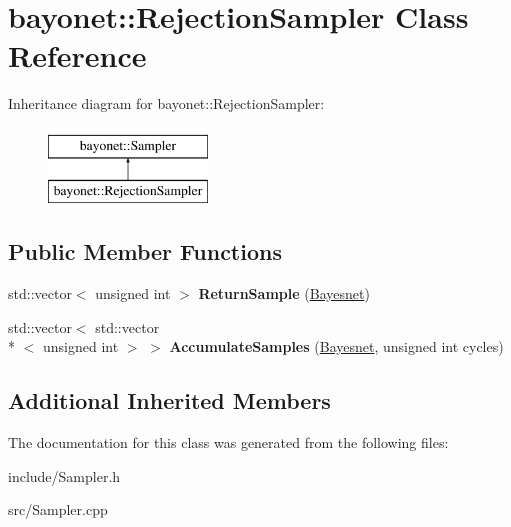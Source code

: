 \hypertarget{classbayonet_1_1_rejection_sampler}{\section{bayonet\-:\-:Rejection\-Sampler Class Reference}
\label{classbayonet_1_1_rejection_sampler}
}
Inheritance diagram for bayonet\-:\-:Rejection\-Sampler\-:\begin{figure}[H]
\begin{center}
\leavevmode
\includegraphics[height=2.000000cm]{classbayonet_1_1_rejection_sampler}
\end{center}
\end{figure}
\subsection*{Public Member Functions}
\begin{DoxyCompactItemize}
\item 
\hypertarget{classbayonet_1_1_rejection_sampler_afc42e3115c1bc96fa19ff1eb8a082180}{std\-::vector$<$ unsigned int $>$ {\bfseries Return\-Sample} (\hyperlink{classbayonet_1_1_bayesnet}{Bayesnet})}\label{classbayonet_1_1_rejection_sampler_afc42e3115c1bc96fa19ff1eb8a082180}

\item 
\hypertarget{classbayonet_1_1_rejection_sampler_a036f41259a143b1a101047fcdcf6a580}{std\-::vector$<$ std\-::vector\\*
$<$ unsigned int $>$ $>$ {\bfseries Accumulate\-Samples} (\hyperlink{classbayonet_1_1_bayesnet}{Bayesnet}, unsigned int cycles)}\label{classbayonet_1_1_rejection_sampler_a036f41259a143b1a101047fcdcf6a580}

\end{DoxyCompactItemize}
\subsection*{Additional Inherited Members}


The documentation for this class was generated from the following files\-:\begin{DoxyCompactItemize}
\item 
include/Sampler.\-h\item 
src/Sampler.\-cpp\end{DoxyCompactItemize}
